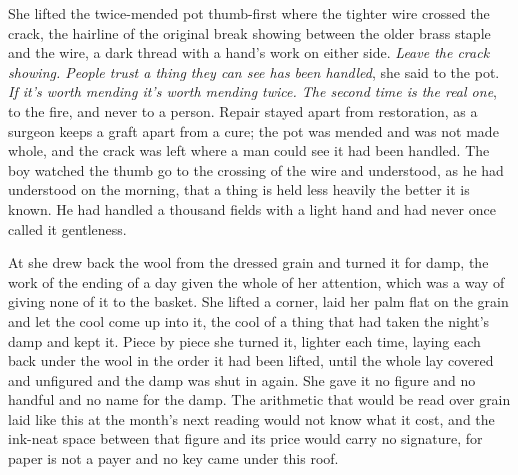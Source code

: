 She lifted the twice-mended pot thumb-first where the tighter wire crossed the crack, the hairline of the original break showing between the older brass staple and the wire, a dark thread with a hand's work on either side. \emph{Leave the crack showing. People trust a thing they can see has been handled}, she said to the pot. \emph{If it's worth mending it's worth mending twice. The second time is the real one}, to the fire, and never to a person. Repair stayed apart from restoration, as a surgeon keeps a graft apart from a cure; the pot was mended and was not made whole, and the crack was left where a man could see it had been handled. The boy watched the thumb go to the crossing of the wire and understood, as he had understood on the morning, that a thing is held less heavily the better it is known. He had handled a thousand fields with a light hand and had never once called it gentleness.

At  she drew back the wool from the dressed grain and turned it for damp, the work of the ending of a day given the whole of her attention, which was a way of giving none of it to the basket. She lifted a corner, laid her palm flat on the grain and let the cool come up into it, the cool of a thing that had taken the night's damp and kept it. Piece by piece she turned it, lighter each time, laying each back under the wool in the order it had been lifted, until the whole lay covered and unfigured and the damp was shut in again. She gave it no figure and no handful and no name for the damp. The arithmetic that would be read over grain laid like this at the month's next reading would not know what it cost, and the ink-neat space between that figure and its price would carry no signature, for paper is not a payer and no key came under this roof.

